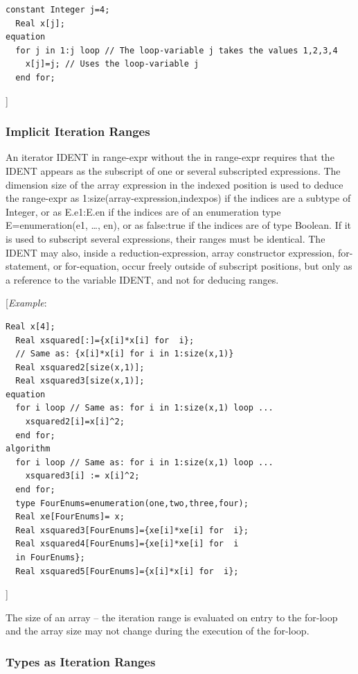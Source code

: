 \documentclass[10pt,a4paper]{report}
\def\doublelabel#1{\label{#1}\hypertarget{#1}{}}
\begin{document}
\begin{lstlisting}[language=modelica]
  constant Integer j=4;
  Real x[j];
equation
  for j in 1:j loop // The loop-variable j takes the values 1,2,3,4
    x[j]=j; // Uses the loop-variable j
  end for;
\end{lstlisting}
{]}

\subsubsection{Implicit Iteration Ranges}\doublelabel{implicit-iteration-ranges}

An iterator IDENT in range-expr without the in range-expr requires that
the IDENT appears as the subscript of one or several subscripted
expressions. The dimension size of the array expression in the indexed
position is used to deduce the range-expr as
1:size(array-expression,indexpos) if the indices are a subtype of
Integer, or as E.e1:E.en if the indices are of an enumeration type
E=enumeration(e1, \ldots{}, en), or as false:true if the indices are of
type Boolean. If it is used to subscript several expressions, their
ranges must be identical. The IDENT may also, inside a
reduction-expression, array constructor expression, for-statement, or
for-equation, occur freely outside of subscript positions, but only as a
reference to the variable IDENT, and not for deducing ranges.

{[}\emph{Example}:

\begin{lstlisting}[language=modelica]
  Real x[4];
  Real xsquared[:]={x[i]*x[i] for  i};
  // Same as: {x[i]*x[i] for i in 1:size(x,1)}
  Real xsquared2[size(x,1)];
  Real xsquared3[size(x,1)];
equation
  for i loop // Same as: for i in 1:size(x,1) loop ...
    xsquared2[i]=x[i]^2;
  end for;
algorithm
  for i loop // Same as: for i in 1:size(x,1) loop ...
    xsquared3[i] := x[i]^2;
  end for;
  type FourEnums=enumeration(one,two,three,four);
  Real xe[FourEnums]= x;
  Real xsquared3[FourEnums]={xe[i]*xe[i] for  i};
  Real xsquared4[FourEnums]={xe[i]*xe[i] for  i
  in FourEnums};
  Real xsquared5[FourEnums]={x[i]*x[i] for  i};
\end{lstlisting}
{]}

The size of an array -- the iteration range is evaluated on entry to the
for-loop and the array size may not change during the execution of the
for-loop.

\subsubsection{Types as Iteration Ranges }\doublelabel{types-as-iteration-ranges}
\end{document}
